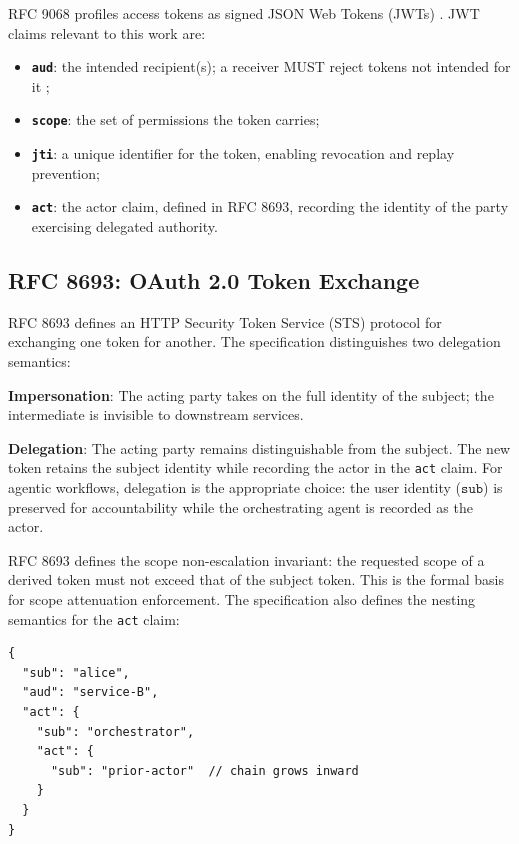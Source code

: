 \documentclass[journal]{IEEEtran}
\begin{document}
RFC 9068 \cite{rfc9068} profiles access tokens as signed JSON Web Tokens (JWTs)
\cite{rfc7519}. JWT claims relevant to this work are:
\begin{itemize}
  \item \textbf{\texttt{aud}}: the intended recipient(s); a receiver MUST reject
        tokens not intended for it \cite{rfc9068};
  \item \textbf{\texttt{scope}}: the set of permissions the token carries;
  \item \textbf{\texttt{jti}}: a unique identifier for the token, enabling
        revocation and replay prevention;
  \item \textbf{\texttt{act}}: the actor claim, defined in RFC 8693, recording
        the identity of the party exercising delegated authority.
\end{itemize}

\subsection{RFC 8693: OAuth 2.0 Token Exchange}

RFC 8693 \cite{rfc8693} defines an HTTP Security Token Service (STS) protocol
for exchanging one token for another. The specification distinguishes two
delegation semantics:

\textbf{Impersonation}: The acting party takes on the full identity of the subject;
the intermediate is invisible to downstream services.

\textbf{Delegation}: The acting party remains distinguishable from the subject.
The new token retains the subject identity while recording the actor in the
\texttt{act} claim. For agentic workflows, delegation is the appropriate
choice: the user identity ($\texttt{sub}$) is preserved for accountability while
the orchestrating agent is recorded as the actor.

RFC 8693 defines the scope non-escalation invariant: the requested scope of a
derived token must not exceed that of the subject token. This is the formal basis
for scope attenuation enforcement. The specification also defines the nesting
semantics for the \texttt{act} claim:

\begin{lstlisting}[language={},caption={Nested act claim per RFC 8693 \S 4.1}]
{
  "sub": "alice",
  "aud": "service-B",
  "act": {
    "sub": "orchestrator",
    "act": {
      "sub": "prior-actor"  // chain grows inward
    }
  }
}
\end{lstlisting}
\end{document}
